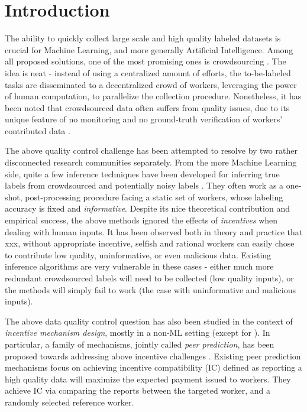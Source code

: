 \section{Introduction}
The ability to quickly collect large scale and high quality labeled datasets is crucial for Machine Learning, and more generally Artificial Intelligence. Among all proposed solutions, one of the most promising ones is crowdsourcing \cite{slivkins2014online,difallah2015dynamics,simpson2015language}. The idea is neat - instead of using a centralized amount of efforts, the to-be-labeled tasks are disseminated to a decentralized crowd of workers, leveraging the power of human computation, to parallelize the collection procedure. Nonetheless, it has been noted that crowdsourced data often suffers from quality issues, due to its unique feature of no monitoring and no ground-truth verification of workers' contributed data \cite{waggoner2014output}. 

The above quality control challenge has been attempted to resolve by two rather disconnected research communities separately. From the more Machine Learning side, quite a few inference techniques have been developed for inferring true labels from crowdsourced and potentially noisy labels \cite{dawid1979maximum,raykar2010learning,liu2012variational,chen2015statistical,zheng2017truth}. They often work as a one-shot, post-processing procedure facing a static set of workers, whose labeling accuracy is fixed and \emph{informative}. Despite its nice theoretical contribution and empirical success, the above methods ignored the effects of \emph{incentives} when dealing with human inputs. It has been observed both in theory and practice that {\color{red} xxx\cite{liu2017sequential}}, without appropriate incentive, selfish and rational workers can easily chose to contribute low quality, uninformative, or even malicious data. Existing inference algorithms are very vulnerable in these cases - either much more redundant crowdsourced labels will need to be collected (low quality inputs), or the methods will simply fail to work (the case with uninformative and malicious inputs). 

The above data quality control question has also been studied in the context of \emph{incentive mechanism design}, mostly in a non-ML setting (except for \cite{liu2017machine}). In particular, a family of mechanisms, jointly called \emph{peer prediction}, has been proposed towards addressing above incentive challenges \cite{prelec2004bayesian,gneiting2007strictly,jurca2009mechanisms,witkowski2012peer,radanovic2013robust,dasgupta2013crowdsourced}. Existing peer prediction mechanisms focus on achieving incentive compatibility (IC) defined as reporting a high quality data will maximize the expected payment issued to workers. They achieve IC via comparing the reports between the targeted worker, and a randomly selected reference worker.

